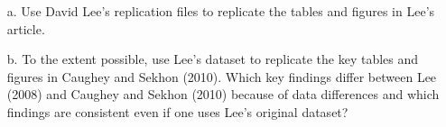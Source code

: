 \documentclass{article}
\begin{document}
\begin{enumerate}
\item[a.] Use David Lee's replication files to replicate the tables
  and figures in Lee's article.

\item[b.] To the extent possible, use Lee's dataset to replicate the
  key tables and figures in Caughey and Sekhon (2010). Which key
  findings differ between Lee (2008) and Caughey and Sekhon (2010)
  because of data differences and which findings are consistent even
  if one uses Lee's original dataset?
\end{enumerate}
\end{document}
